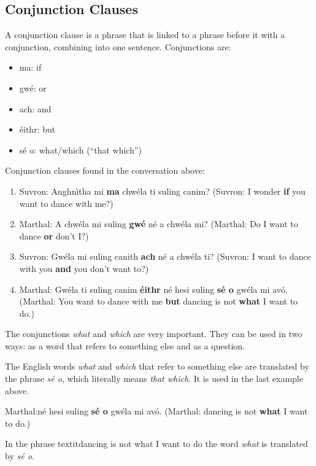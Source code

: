 \subsection{Conjunction Clauses}

A conjunction clause is a phrase that is linked to a phrase before it with a conjunction, combining into one sentence. Conjunctions are:

\begin{itemize}
  \item ma: if
  \item gw\'{e}: or
  \item ach: and
  \item \'{e}ithr: but
  \item s\'{e} o: what/which (``that which'')
\end{itemize}


Conjunction clauses found in the conversation above:
\begin{enumerate}
  \item Suvron: Anghn\'{\i}tha mi \textbf{ma} chw\'{e}la ti suling canim?
(Suvron: I wonder \textbf{if} you want to dance with me?)
  \item Marthal: A chw\'{e}la mi suling \textbf{gw\'{e}} n\'{e} a chw\'{e}la mi?
(Marthal: Do I want to dance \textbf{or} don't I?)
  \item Suvron: Gw\'{e}la mi suling canith \textbf{ach} n\'{e} a chw\'{e}la ti?
(Suvron: I want to dance with you \textbf{and} you don't want to?)
\item Marthal: Gw\'{e}la ti suling canim \textbf{\'{e}ithr} n\'{e} hesi suling \textbf{s\'{e} o} gw\'{e}la mi av\'{o}.
(Marthal: You want to dance with me \textbf{but} dancing is not \textbf{what} I want to do.)
\end{enumerate}

The conjunctions \textit{what} and \textit{which} are very important. They can be used in two ways: as a word that refers to something else and as a question.

The English words \textit{what} and \textit{which} that refer to something else are translated by the phrase \textit{s\'{e} o}, which literally means \textit{that which}. It is used in the last example above.

Marthal:n\'{e} hesi suling \textbf{s\'{e} o} gw\'{e}la mi av\'{o}.
(Marthal: dancing is not \textbf{what} I want to do.)

In the phrase textit{dancing is not what I want to do} the word \textit{what} is translated by \textit{s\'{e} o}.

